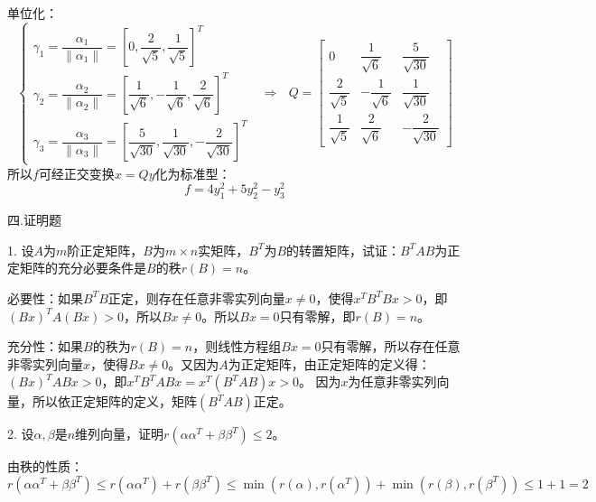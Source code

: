 \documentclass{article}
\begin{document}
\begin{jie}
单位化：
\begin{equation*}
\begin{cases}
\gamma_1=\dfrac{\alpha_1}{\|\alpha_1\|}=\left[0,\dfrac{2}{\sqrt{5}},\dfrac{1}{\sqrt{5}}\right]^T\\[2mm]
\gamma_2=\dfrac{\alpha_2}{\|\alpha_2\|}=\left[\dfrac{1}{\sqrt{6}},-\dfrac{1}{\sqrt{6}},\dfrac{2}{\sqrt{6}}\right]^T\\[2mm]
\gamma_3=\dfrac{\alpha_3}{\|\alpha_3\|}=\left[\dfrac{5}{\sqrt{30}},\dfrac{1}{\sqrt{30}},-\dfrac{2}{\sqrt{30}}\right]^T
\end{cases}~~~\Rightarrow~~~Q=
\begin{bmatrix}
0&\dfrac{1}{\sqrt{6}}&\dfrac{5}{\sqrt{30}}\\[2mm]
\dfrac{2}{\sqrt{5}}&-\dfrac{1}{\sqrt{6}}&\dfrac{1}{\sqrt{30}}\\[2mm]
\dfrac{1}{\sqrt{5}}&\dfrac{2}{\sqrt{6}}&-\dfrac{2}{\sqrt{30}}
\end{bmatrix}
\end{equation*}
所以$f$可经正交变换$x=Qy$化为标准型：
\begin{equation*}
  f=4y_{1}^2+5y_{2}^2-y_{3}^2
\end{equation*}
\end{jie}

四.证明题

1. 设$A$为$m$阶正定矩阵，$B$为$m\times n$实矩阵，$B^{T}$为$B$的转置矩阵，试证：$B^{T}AB$为正定矩阵的充分必要条件是$B$的秩$r(B)=n$。

\begin{zhengming}
必要性：如果$B^TB$正定，则存在任意非零实列向量$x\neq 0$，使得$x^TB^TBx>0$，即$(Bx)^TA(Bx)>0$，所以$Bx\neq 0$。所以$Bx=0$只有零解，即$r(B)=n$。

充分性：如果$B$的秩为$r(B)=n$，则线性方程组$Bx=0$只有零解，所以存在任意非零实列向量$x$，使得$Bx\neq 0$。又因为$A$为正定矩阵，由正定矩阵的定义得：$(Bx)^TABx>0$，即$x^TB^TABx=x^T(B^TAB)x>0$。
因为$x$为任意非零实列向量，所以依正定矩阵的定义，矩阵$(B^TAB)$正定。
\end{zhengming}

2. 设$\alpha,\beta$是$n$维列向量，证明$r(\alpha\alpha^{T}+\beta\beta^{T})\leq 2$。

\begin{zhengming}
由秩的性质：
\begin{equation*}
r(\alpha\alpha^ {T}+\beta\beta^{T})\leq r(\alpha\alpha^ {T})+r(\beta\beta^{T})\leq \min(r(\alpha),r(\alpha^T))+\min(r(\beta),r(\beta^T))\leq 1+1=2
\end{equation*}
\end{zhengming}
\end{document}

